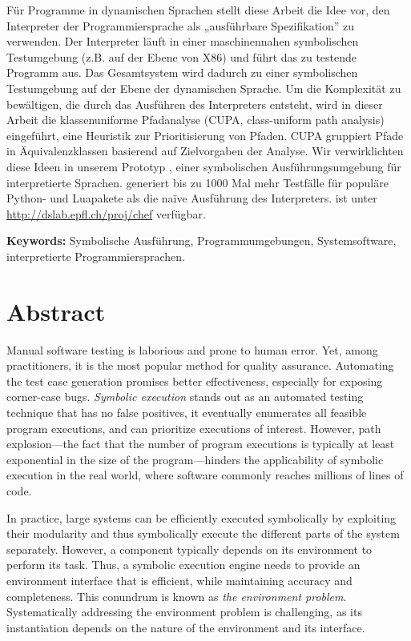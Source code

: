 Für Programme in dynamischen Sprachen stellt diese Arbeit die Idee vor, den Interpreter der Programmiersprache als „ausführbare Spezifikation” zu verwenden. Der Interpreter läuft in einer maschinennahen symbolischen Testumgebung (z.B. auf der Ebene von X86) und führt das zu testende Programm aus. Das Gesamtsystem wird dadurch zu einer symbolischen Testumgebung auf der Ebene der dynamischen Sprache. Um die Komplexität zu bewältigen, die durch das Ausführen des Interpreters entsteht, wird in dieser Arbeit die klassenuniforme Pfadanalyse (CUPA, class-uniform path analysis) eingeführt, eine Heuristik zur Prioritisierung von Pfaden. CUPA gruppiert Pfade in Äquivalenzklassen basierend auf Zielvorgaben der Analyse. Wir verwirklichten diese Ideen in unserem Prototyp \emph{\chef}, einer symbolischen Ausführungsumgebung für interpretierte Sprachen. \chef generiert bis zu 1000 Mal mehr Testfälle für populäre Python- und Luapakete als die naïve Ausführung des Interpreters. \chef ist unter  {\url{http://dslab.epfl.ch/proj/chef}} verfügbar.

\noindent \textbf{Keywords:} Symbolische Ausführung, Programmumgebungen, Systemsoftware, interpretierte Programmiersprachen.


\chapter*{Abstract}

Manual software testing is laborious and prone to human error.  Yet, among practitioners, it is the most popular method for quality assurance.  Automating the test case generation promises better effectiveness, especially for exposing corner-case bugs.
%
\emph{Symbolic execution} stands out as an automated testing technique that has no false positives, it eventually enumerates all feasible program executions, and can prioritize executions of interest.
%
However, path explosion---the fact that the number of program executions is typically at least exponential in the size of the program---hinders the applicability of symbolic execution in the real world, where software commonly reaches millions of lines of code.

In practice, large systems can be efficiently executed symbolically by exploiting their modularity and thus symbolically execute the different parts of the system separately.
%
However, a component typically depends on its environment to perform its task.  Thus, a symbolic execution engine needs to provide an environment interface that is efficient, while maintaining accuracy and completeness.  This conundrum is known as \emph{the environment problem}.
%
Systematically addressing the environment problem is challenging, as its instantiation depends on the nature of the environment and its interface.

